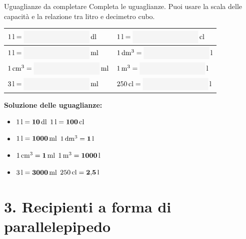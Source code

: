 \begin{esercizio}{Uguaglianze da completare}
Completa le uguaglianze. Puoi usare la scala delle capacità e la relazione tra litro e decimetro cubo.

\vspace{0.2cm}
\renewcommand{\arraystretch}{2.25}
\begin{tabularx}{\linewidth}{|X|X|}
\hline
$1\,\mathrm{l}=\fillbox{3.1cm}\,\mathrm{dl}$ & $1\,\mathrm{l}=\fillbox{3.1cm}\,\mathrm{cl}$ \\
\hline
$1\,\mathrm{l}=\fillbox{3.1cm}\,\mathrm{ml}$ & $1\,\mathrm{dm^3}=\fillbox{3.1cm}\,\mathrm{l}$ \\
\hline
$1\,\mathrm{cm^3}=\fillbox{3.1cm}\,\mathrm{ml}$ & $1\,\mathrm{m^3}=\fillbox{3.1cm}\,\mathrm{l}$ \\
\hline
$3\,\mathrm{l}=\fillbox{3.1cm}\,\mathrm{ml}$ & $250\,\mathrm{cl}=\fillbox{3.1cm}\,\mathrm{l}$ \\
\hline
\end{tabularx}

\begin{soluzione}
  \textbf{Soluzione delle uguaglianze:}
  \begin{itemize}
    \item $1\,\mathrm{l} = \mathbf{10}\,\mathrm{dl}$ \hfill $1\,\mathrm{l} = \mathbf{100}\,\mathrm{cl}$
    \item $1\,\mathrm{l} = \mathbf{1000}\,\mathrm{ml}$ \hfill $1\,\mathrm{dm^3} = \mathbf{1}\,\mathrm{l}$
    \item $1\,\mathrm{cm^3} = \mathbf{1}\,\mathrm{ml}$ \hfill $1\,\mathrm{m^3} = \mathbf{1000}\,\mathrm{l}$
    \item $3\,\mathrm{l} = \mathbf{3000}\,\mathrm{ml}$ \hfill $250\,\mathrm{cl} = \mathbf{2{,}5}\,\mathrm{l}$
  \end{itemize}
\end{soluzione}
\end{esercizio}

\condnewpage

\section*{3. Recipienti a forma di parallelepipedo}

